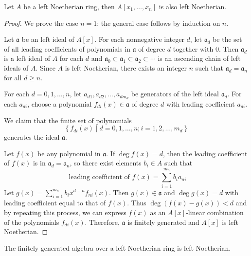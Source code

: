 \begin{theorem}
    Let $A$ be a left Noetherian ring, then $A[x_1,\ldots,x_n]$ is also left Noetherian.
    \begin{proof}
        We prove the case $n=1$; the general case follows by induction on $n$.

        Let $\mathfrak{a}$ be an left ideal of $A[x]$.
        For each nonnegative integer $d$, let $\mathfrak{a}_d$ be the set of all leading coefficients of polynomials in $\mathfrak{a}$ of degree $d$ together with 0.
        Then $\mathfrak{a}_d$ is a left ideal of $A$ for each $d$ and $\mathfrak{a}_0 \subset \mathfrak{a}_1 \subset \mathfrak{a}_2 \subset \cdots$ is an ascending chain of left ideals of $A$.
        Since $A$ is left Noetherian, there exists an integer $n$ such that $\mathfrak{a}_d=\mathfrak{a}_n$ for all $d \geq n$.

        For each $d=0,1, \ldots, n$, let $a_{d 1}, a_{d 2}, \ldots, a_{d m_d}$ be generators of the left ideal $\mathfrak{a}_d$.
        For each $a_{d i}$, choose a polynomial $f_{d i}(x) \in \mathfrak{a}$ of degree $d$ with leading coefficient $a_{d i}$.

        We claim that the finite set of polynomials
        \begin{equation*}
            \left\{f_{d i}(x) \mid d=0,1, \ldots, n ; i=1,2, \ldots, m_d\right\}
        \end{equation*}
        generates the ideal $\mathfrak{a}$.

        Let $f(x)$ be any polynomial in $\mathfrak{a}$.
        If $\deg f(x)=d$, then the leading coefficient of $f(x)$ is in $\mathfrak{a}_d=\mathfrak{a}_n$, so there exist elements $b_i \in A$ such that
        \begin{equation*}
            \text { leading coefficient of } f(x)=\sum_{i=1}^{m_n} b_i a_{n i}
        \end{equation*}
        Let $g(x)=\sum_{i=1}^{m_n} b_i x^{d-n} f_{n i}(x)$.
        Then $g(x) \in \mathfrak{a}$ and $\deg g(x)=d$ with leading coefficient equal to that of $f(x)$. Thus $\deg\left(f(x)-g(x)\right)<d$ and by repeating this process, we can express $f(x)$ as an $A[x]$-linear combination of the polynomials $f_{d i}(x)$. Therefore, $\mathfrak{a}$ is finitely generated and $A[x]$ is left Noetherian.
    \end{proof}
\end{theorem}

\begin{corollary}
    The finitely generated algebra over a left Noetherian ring is left  Noetherian.
\end{corollary}

